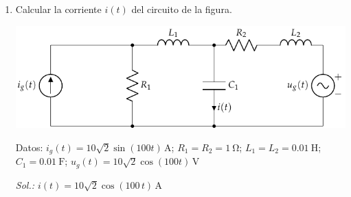 \begin{enumerate}
  Suponiendo que las cargas trabajan a su tensión nominal de
  $\SI{230}{\volt}$ y que están situadas a $\SI{100}{\meter}$ del
  generador, calcule:

  \begin{enumerate}
  \item Triángulo de potencias total de las cargas ($P_T$, $Q_T$,
    $S_T$) y factor de potencia.
  \item Valor eficaz de la corriente que circula por la línea.
  \item Potencia disipada en la línea.
  \item Triángulo de potencias del generador ($P_g$, $Q_g$, $S_g$) y
    factor de potencia.
  \item Valor eficaz de la tensión de salida del generador.
  \item Capacidad del banco de condensadores a instalar en bornes de
    la carga necesario para reducir la corriente que circula por la
    línea a un valor de $\SI{45}{\ampere}$.
  \end{enumerate}

  Independientemente del resultado obtenido, suponga que la capacidad
  instalada es $C = \SI{172}{\micro\farad}$. En estas condiciones,
  calcule:
  \begin{enumerate}[resume]
  \item Potencia aparente de las cargas (incluyendo al banco de
    condensadores)
  \item Valor eficaz de la corriente que circula por la línea y
    potencia disipada en la misma.
  \item Triángulo de potencias del generador y factor de potencia.
  \item Tensión de trabajo del generador.
  \end{enumerate}
  \emph{Sol.
    $ S_T = \SI{11868.4}{\voltampere}; I = \SI{51.6}{\ampere}; P_L =
    \SI{362.1}{\watt}; S_g = \SI{12155.4}{\voltampere}; U_g =
    \SI{235.6}{\volt}; C = \SI{172.3}{\micro\farad}; S'_T =
    \SI{10350.1}{\voltampere}; I' = \SI{45}{\ampere}; S'_g =
    \SI{10599.2}{\voltampere}; U'_g = \SI{235.5}{\volt} $}

\item
Calcular la corriente $i(t)$ del circuito de la figura.

  \begin{center}
    \includegraphics[width=0.8\linewidth]{../figs/BT2_13.pdf}
  \end{center}

Datos:\; $i_g(t) = 10\sqrt{2}\sin(100t)\,\unit{\ampere}$;\; $R_1 = R_2 = \qty{1}{\ohm}$;\; $L_1 = L_2 = \qty{0.01}{\henry}$;\; $C_1 = \qty{0.01}{\farad}$;\; $u_g(t) = 10\sqrt{2}\cos(100t)\,\unit{\volt}$


  \emph{Sol.:\; $i(t)=10\sqrt{2}\cos(100\,t)\,\unit{\ampere}$}

\end{enumerate}
